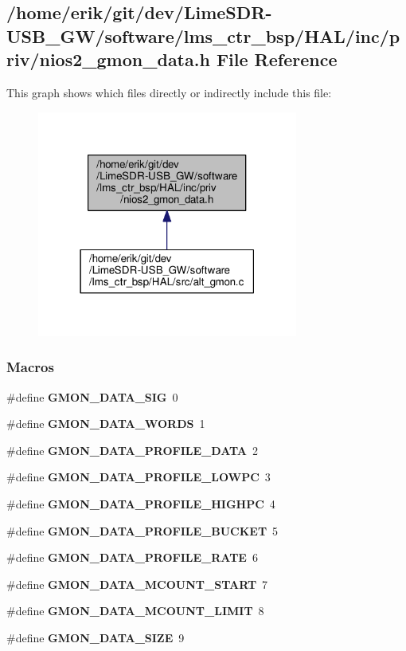 \subsection{/home/erik/git/dev/\+Lime\+S\+D\+R-\/\+U\+S\+B\+\_\+\+G\+W/software/lms\+\_\+ctr\+\_\+bsp/\+H\+A\+L/inc/priv/nios2\+\_\+gmon\+\_\+data.h File Reference}
\label{nios2__gmon__data_8h}
This graph shows which files directly or indirectly include this file\+:
\nopagebreak
\begin{figure}[H]
\begin{center}
\leavevmode
\includegraphics[width=243pt]{d6/d53/nios2__gmon__data_8h__dep__incl}
\end{center}
\end{figure}
\subsubsection*{Macros}
\begin{DoxyCompactItemize}
\item 
\#define {\bf G\+M\+O\+N\+\_\+\+D\+A\+T\+A\+\_\+\+S\+IG}~0
\item 
\#define {\bf G\+M\+O\+N\+\_\+\+D\+A\+T\+A\+\_\+\+W\+O\+R\+DS}~1
\item 
\#define {\bf G\+M\+O\+N\+\_\+\+D\+A\+T\+A\+\_\+\+P\+R\+O\+F\+I\+L\+E\+\_\+\+D\+A\+TA}~2
\item 
\#define {\bf G\+M\+O\+N\+\_\+\+D\+A\+T\+A\+\_\+\+P\+R\+O\+F\+I\+L\+E\+\_\+\+L\+O\+W\+PC}~3
\item 
\#define {\bf G\+M\+O\+N\+\_\+\+D\+A\+T\+A\+\_\+\+P\+R\+O\+F\+I\+L\+E\+\_\+\+H\+I\+G\+H\+PC}~4
\item 
\#define {\bf G\+M\+O\+N\+\_\+\+D\+A\+T\+A\+\_\+\+P\+R\+O\+F\+I\+L\+E\+\_\+\+B\+U\+C\+K\+ET}~5
\item 
\#define {\bf G\+M\+O\+N\+\_\+\+D\+A\+T\+A\+\_\+\+P\+R\+O\+F\+I\+L\+E\+\_\+\+R\+A\+TE}~6
\item 
\#define {\bf G\+M\+O\+N\+\_\+\+D\+A\+T\+A\+\_\+\+M\+C\+O\+U\+N\+T\+\_\+\+S\+T\+A\+RT}~7
\item 
\#define {\bf G\+M\+O\+N\+\_\+\+D\+A\+T\+A\+\_\+\+M\+C\+O\+U\+N\+T\+\_\+\+L\+I\+M\+IT}~8
\item 
\#define {\bf G\+M\+O\+N\+\_\+\+D\+A\+T\+A\+\_\+\+S\+I\+ZE}~9
\end{DoxyCompactItemize}
